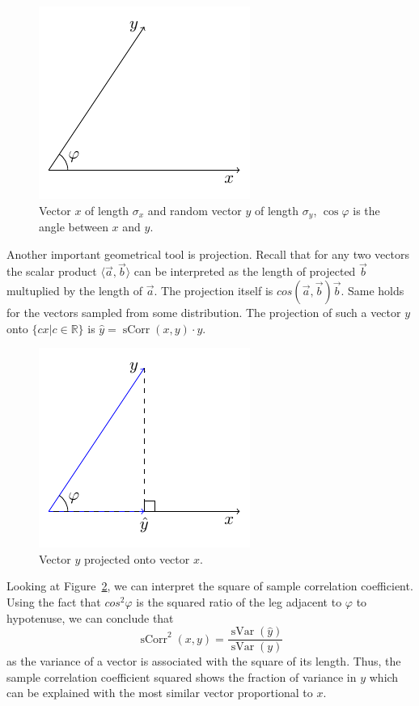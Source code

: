 \documentclass[nobib]{tufte-handout}
\DeclareMathOperator{\sVar}{sVar}
\DeclareMathOperator{\sCorr}{sCorr}
\theoremstyle{definition}
\begin{document}
\begin{figure}[h!]
\begin{center}
\includegraphics[width=0.4\linewidth]{images/corr_def.pdf}
\caption{Vector $x$ of length $\sigma_x$ and random vector $y$ of length $\sigma_y$, $\cos \varphi$ is the angle between $x$ and $y$.}
\label{fig:corr_def}
\end{center}
\end{figure}

Another important geometrical tool is projection. Recall that for any two vectors the scalar product $\langle \vec{a}, \vec{b} \rangle$ can be interpreted as the length of projected $\vec{b}$ multuplied by the length of $\vec{a}$.
The projection itself is $cos(\vec{a}, \vec{b}) \vec{b}$.
Same holds for the vectors sampled from some distribution.
The projection of such a vector $y$ onto $\{cx| c \in \mathbb{R}\}$ is $\hat y = \sCorr(x,y) \cdot y$.

\begin{figure}[h!]
\begin{center}
\includegraphics[width=0.4\linewidth]{images/corr_proj.pdf}
\caption{Vector $y$ projected onto vector $x$.}
\label{fig:corr_proj}
\end{center}
\end{figure}

Looking at Figure~\ref{fig:corr_proj}, we can interpret the square of sample correlation coefficient.
Using the fact that $cos^2 \varphi$ is the squared ratio of the leg adjacent to $\varphi$ to hypotenuse, we can conclude that
\[
\sCorr^2(x,y) = \frac{\sVar(\hat y)}{\sVar(y)}
\]
as the variance of a vector is associated with the square of its length.
Thus, the sample correlation coefficient squared shows the fraction of variance in $y$ which can be explained
with the most similar vector proportional to $x$.
\end{document}
